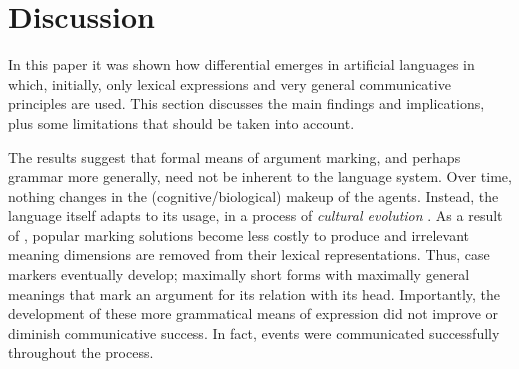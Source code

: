 \documentclass[output=paper]{LSP/langsci}
\begin{document}
\begin{table}
\caption{Representations of three most frequent words of the AFTFTC lineage\label{AFTFTC3}.}
\end{table}

\section{Discussion}\label{17-le-sec:Discussion}
In this paper it was shown how differential  emerges in artificial languages in which, initially, only lexical expressions and very general communicative principles are used. This section discusses the main findings and implications, plus some limitations that should be taken into account. 

The results suggest that formal means of argument marking, and perhaps grammar more generally, need not be inherent to the language system. Over time, nothing changes in the (cognitive/biological) makeup of the agents. Instead, the language itself adapts to its usage, in a process of \textit{cultural evolution} \citep{Smithetal2008Cultural,Christiansenetal2008Language}. As a result of , popular marking solutions become less costly to produce and irrelevant meaning dimensions are removed from their lexical representations. Thus, case markers eventually develop; \ie maximally short forms with maximally general meanings that mark an argument for its relation with its head. Importantly, the development of these more grammatical means of expression did not improve or diminish communicative success. In fact, events were communicated successfully throughout the process. 
\end{document}
